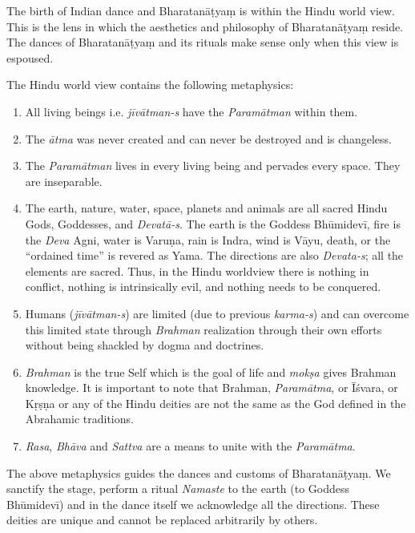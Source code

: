 The birth of Indian dance and Bharatanāṭyaṃ is within the Hindu world view. This is the lens in which the aesthetics and philosophy of Bharatanāṭyaṃ reside. The dances of Bharatanāṭyaṃ and its rituals make sense only when this view is espoused.

The Hindu world view contains the following metaphysics:

\begin{enumerate}[{\rm 1)}]
\itemsep=0pt
\item All living beings i.e. \textit{jīvātman-s} have the \textit{Paramātman} within them. 

 \item The \textit{ātma} was never created and can never be destroyed and is changeless.

 \item The \textit{Paramātman} lives in every living being and pervades every space. They are inseparable. 

 \item The earth, nature, water, space, planets and animals are all sacred Hindu Gods, Goddesses, and \textit{Devatā-s}. The earth is the Goddess Bhūmidevī, fire is the \textit{Deva }Agni, water is Varuṇa, rain is Indra, wind is Vāyu, death, or the “ordained time” is revered as Yama. The directions are also \textit{Devata-s}; all the elements are sacred. Thus, in the Hindu worldview there is nothing in conflict, nothing is intrinsically evil, and nothing needs to be conquered. 

 \item Humans (\textit{jīvātman-s}) are limited (due to previous \textit{karma-s}) and can overcome this limited state through \textit{Brahman} realization through their own efforts without being shackled by dogma and doctrines.

 \item \textit{Brahman} is the true Self which is the goal of life and \textit{mokṣa} gives Brahman knowledge. It is important to note that Brahman, \textit{Paramātma}, or Īśvara, or Kṛṣṇa or any of the Hindu deities are not the same as the God defined in the Abrahamic traditions.

 \item \textit{Rasa}, \textit{Bhāva }and \textit{Sattva} are a means to unite with the \textit{Paramātma}.

\end{enumerate}

The above metaphysics guides the dances and customs of Bharata\-nāṭyaṃ. We sanctify the stage, perform a ritual \textit{Namaste} to the earth (to Goddess Bhūmidevī) and in the dance itself we acknowledge all the directions. These deities are unique and cannot be replaced arbitrarily by others.

